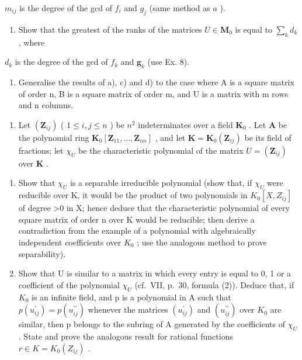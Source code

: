 \(m_{ij}\) is the degree of the gcd of \(f_i\) and \(g_j\) (same method as \(a\) ).

\begin{enumerate}
\def\labelenumi{\alph{enumi})}
\setcounter{enumi}{3}
\tightlist
\item
  Show that the greatest of the ranks of the matrices \(U \in \mathbf{M}_0\) is equal to \(\sum_{k} d_k\) , where
\end{enumerate}

\(d_{k}\) is the degree of the gcd of \(f_{k}\) and \(\pmb{g}_{k}\) (use Ex. 8).

\begin{enumerate}
\def\labelenumi{\alph{enumi})}
\setcounter{enumi}{4}
\tightlist
\item
  Generalise the results of a), c) and d) to the case where A is a square matrix of order n, B is a square matrix of order m, and U is a matrix with m rows and n columns.
\end{enumerate}

\begin{enumerate}
\def\labelenumi{\arabic{enumi})}
\setcounter{enumi}{12}
\tightlist
\item
  Let \((\mathbf{Z}_{ij})\) ( \(1 \leqslant i, j \leqslant n\) ) be \(n^2\) indeterminates over a field \(\mathbf{K}_0\) . Let \(\mathbf{A}\) be the polynomial ring \(\mathbf{K}_0[\mathbf{Z}_{11}, \ldots, \mathbf{Z}_{nn}]\) , and let \(\mathbf{K} = \mathbf{K}_0(\mathbf{Z}_{ij})\) be its field of fractions; let \(\chi_U\) be the characteristic polynomial of the matrix \(U = (\mathbf{Z}_{ij})\) over \(\mathbf{K}\) .
\end{enumerate}

\begin{enumerate}
\def\labelenumi{\alph{enumi})}
\item
  Show that \(\chi_{U}\) is a separable irreducible polynomial (show that, if \(\chi_{U}\) were reducible over K, it would be the product of two polynomials in \(K_{0}[X, Z_{ij}]\) of degree \textgreater0 in X; hence deduce that the characteristic polynomial of every square matrix of order n over K would be reducible; then derive a contradiction from the example of a polynomial with algebraically independent coefficients over \(K_{0}\) ; use the analogous method to prove separability).
\item
  Show that U is similar to a matrix in which every entry is equal to 0, 1 or a coefficient of the polynomial \(\chi_{U}\) (cf.~VII, p.~30, formula (2)). Deduce that, if \(K_{0}\) is an infinite field, and p is a polynomial in A such that \(p(u_{ij}^{\prime}) = p(u_{ij}^{\prime\prime})\) whenever the matrices \((u_{ij}^{\prime})\) and \((u_{ij}^{\prime\prime})\) over \(K_{0}\) are similar, then p belongs to the subring of A generated by the coefficients of \(\chi_{U}\) . State and prove the analogous result for rational functions \(r \in K = K_{0}(Z_{ij})\) .
\end{enumerate}

